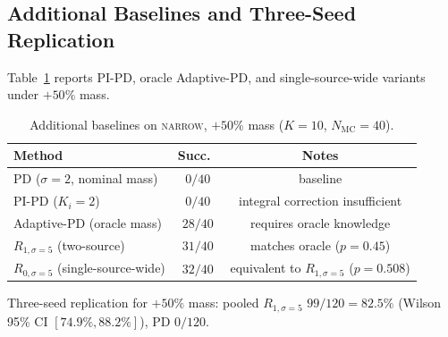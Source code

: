 \documentclass[11pt,a4paper]{article}
\newcommand{\Nm}{N_{\mathrm{MC}}}
\begin{document}
\subsection{Additional Baselines and Three-Seed Replication}
Table~\ref{tab:s1-baselines} reports PI-PD, oracle Adaptive-PD, and
single-source-wide variants under $+50\%$ mass.
\begin{table}[h]
\centering
\caption{Additional baselines on \textsc{narrow}, $+50\%$ mass
($K = 10$, $\Nm = 40$).}\label{tab:s1-baselines}
\begin{tabular}{lcc}
\toprule
Method & Succ.\ & Notes \\
\midrule
PD ($\sigma = 2$, nominal mass) & $0/40$ & baseline \\
PI-PD ($K_i = 2$) & $0/40$ & integral correction insufficient \\
Adaptive-PD (oracle mass) & $28/40$ & requires oracle knowledge \\
$R_{1,\sigma=5}$ (two-source) & $31/40$ & matches oracle ($p = 0.45$) \\
$R_{0,\sigma=5}$ (single-source-wide) & $32/40$ & equivalent to $R_{1,\sigma=5}$ ($p = 0.508$) \\
\bottomrule
\end{tabular}
\end{table}

Three-seed replication for $+50\%$ mass: pooled $R_{1,\sigma=5}$
$99/120 = 82.5\%$ (Wilson 95\% CI $[74.9\%, 88.2\%]$), PD $0/120$.
\end{document}
